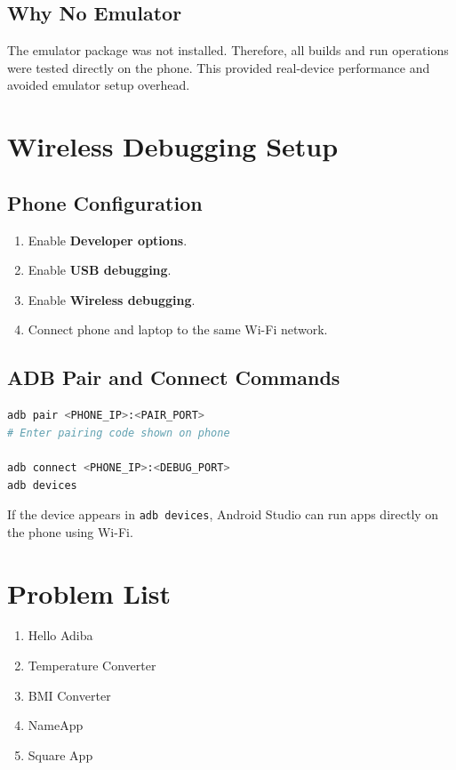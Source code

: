 \documentclass[12pt]{article}
\begin{document}
\subsection{Why No Emulator}
The emulator package was not installed. Therefore, all builds and run operations were tested directly on the phone. This provided real-device performance and avoided emulator setup overhead.

\section{Wireless Debugging Setup}
\subsection{Phone Configuration}
\begin{enumerate}[leftmargin=*]
    \item Enable \textbf{Developer options}.
    \item Enable \textbf{USB debugging}.
    \item Enable \textbf{Wireless debugging}.
    \item Connect phone and laptop to the same Wi-Fi network.
\end{enumerate}

\subsection{ADB Pair and Connect Commands}
\begin{lstlisting}[language=bash,caption={Wireless debugging commands}]
adb pair <PHONE_IP>:<PAIR_PORT>
# Enter pairing code shown on phone

adb connect <PHONE_IP>:<DEBUG_PORT>
adb devices
\end{lstlisting}

If the device appears in \texttt{adb devices}, Android Studio can run apps directly on the phone using Wi-Fi.

\section{Problem List}
\begin{enumerate}[leftmargin=*]
    \item Hello Adiba
    \item Temperature Converter
    \item BMI Converter
    \item NameApp
    \item Square App
\end{enumerate}
\end{document}
